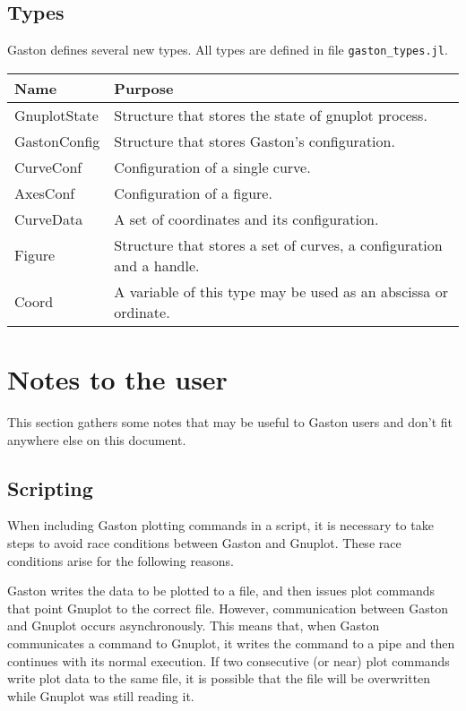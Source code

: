 \documentclass[11pt]{article}
\newcommand{\cmd}[1]{\texttt{#1}}
\begin{document}
\subsection{Types}

Gaston defines several new types. All types are defined in file
\cmd{gaston\_types.jl}.

\begin{center}
	\begin{tabular}{lp{8cm}}
		\toprule
		\textbf{Name} & \textbf{Purpose} \\
		\midrule
		GnuplotState & Structure that stores the state of gnuplot process. \\
		GastonConfig & Structure that stores Gaston's configuration. \\
		CurveConf & Configuration of a single curve. \\
		AxesConf & Configuration of a figure. \\
		CurveData & A set of coordinates and its configuration. \\
		Figure & Structure that stores a set of curves, a configuration and a
		handle. \\
		Coord & A variable of this type may be used as an abscissa or ordinate. \\
		\bottomrule
	\end{tabular}
\end{center}

\section{Notes to the user}

This section gathers some notes that may be useful to Gaston users and don't
fit anywhere else on this document.

\subsection{Scripting}
When including Gaston plotting commands in a script, it is necessary to take
steps to avoid race conditions between Gaston and Gnuplot. These race
conditions arise for the following reasons.

Gaston writes the data to be plotted to a file, and then issues plot commands
that point Gnuplot to the correct file. However, communication between Gaston
and Gnuplot occurs asynchronously. This means that, when Gaston communicates a
command to Gnuplot, it writes the command to a pipe and then continues with its
normal execution.  If two consecutive (or near) plot commands write plot data
to the same file, it is possible that the file will be overwritten while
Gnuplot was still reading it.
\end{document}
